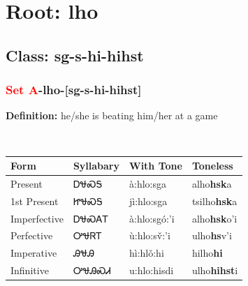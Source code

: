 \needspace{4in}
\section*{Root: lho}
\nopagebreak
{}
\needspace{3in}
\subsection*{Class: sg-s-hi-hihst}
\nopagebreak
\needspace{2in}
\subsubsection*{\textcolor{Red}{Set A}{-}\textbf{lho}{-}[sg-s-hi-hihst]}
\nopagebreak
\textbf{Definition: } he/she is beating him/her at a game
\\[0.5em]
\begin{tabularx}{\textwidth}{l X X X}%
\toprule%
\textbf{Form}&\textbf{Syllabary}&\textbf{With Tone}&\textbf{Toneless}\\%
\midrule%
Present&ᎠᏠᏍᎦ&à:hlo:sga&alho\textbf{hsk}a\\%
1st Present&ᏥᏠᏍᎦ&jì:hlo:sga&tsilho\textbf{hsk}a\\%
Imperfective&ᎠᏠᏍᎪᎢ&à:hlo:sgó:’i&alho\textbf{hsk}o'i\\%
Perfective&ᎤᏠᏒᎢ&ù:hlo:sv̌:’i&ulho\textbf{hs}v'i\\%
Imperative&ᎯᏠᎯ&hì:hlǒ:hi&hilho\textbf{hi}\\%
Infinitive&ᎤᏠᎯᏍᏗ&u:hlo:hisdi&ulho\textbf{hihst}i\\%
\bottomrule%
\end{tabularx}
\\[1em]